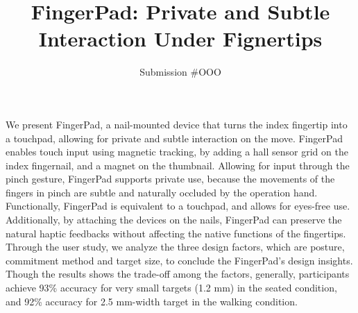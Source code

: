 \documentclass{article}
\begin{document}




\title{FingerPad: Private and Subtle Interaction Under Fignertips}


\author{Submission \#OOO}

\maketitle


\abstract
We present FingerPad, a nail-mounted device that turns the index fingertip into a touchpad, allowing for private and subtle interaction on the move. 
FingerPad enables touch input using magnetic tracking, by adding a hall sensor grid on the index fingernail, and a magnet on the thumbnail. 
Allowing for input through the pinch gesture, FingerPad supports private use, because the movements of the fingers in pinch are subtle and naturally occluded by the operation hand. 
Functionally, FingerPad is equivalent to a touchpad, and allows for eyes-free use. 
Additionally, by attaching the devices on the nails, FingerPad can preserve the natural haptic feedbacks without affecting the native functions of the fingertips. 
Through the user study, we analyze the three design factors, which are posture, commitment method and target size, to conclude the FingerPad's design insights. 
Though the results shows the trade-off among the factors, generally, participants achieve 93\% accuracy for very small targets (1.2 mm) in the seated condition, and 92\% accuracy for 2.5 mm-width target in the walking condition. 


\end{document}
